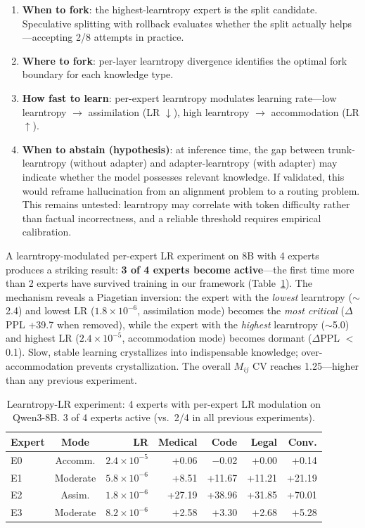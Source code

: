 \documentclass{article}
\begin{document}
\begin{enumerate}[nosep,leftmargin=1em]
\item \textbf{When to fork}: the highest-learntropy expert is the split
      candidate. Speculative splitting with rollback evaluates whether the
      split actually helps---accepting 2/8 attempts in practice.
\item \textbf{Where to fork}: per-layer learntropy divergence identifies the
      optimal fork boundary for each knowledge type.
\item \textbf{How fast to learn}: per-expert learntropy modulates learning
      rate---low learntropy $\to$ assimilation (LR $\downarrow$), high
      learntropy $\to$ accommodation (LR $\uparrow$).
\item \textbf{When to abstain (hypothesis)}: at inference time, the gap
      between trunk-learntropy (without adapter) and adapter-learntropy
      (with adapter) may indicate whether the model possesses relevant
      knowledge. If validated, this would reframe hallucination from an
      alignment problem to a routing problem. This remains untested:
      learntropy may correlate with token difficulty rather than factual
      incorrectness, and a reliable threshold requires empirical
      calibration.
\end{enumerate}

A learntropy-modulated per-expert LR experiment on 8B with 4 experts
produces a striking result: \textbf{3 of 4 experts become active}---the
first time more than 2 experts have survived training in our framework
(Table~\ref{tab:learntropy-lr}). The
mechanism reveals a Piagetian inversion: the expert with the \emph{lowest}
learntropy ($\sim$2.4) and lowest LR ($1.8 \times 10^{-6}$, assimilation
mode) becomes the \emph{most critical} ($\Delta$PPL +39.7 when removed),
while the expert with the \emph{highest} learntropy ($\sim$5.0) and highest
LR ($2.4 \times 10^{-5}$, accommodation mode) becomes dormant ($\Delta$PPL
$<$0.1). Slow, stable learning crystallizes into indispensable knowledge;
over-accommodation prevents crystallization. The overall $M_{ij}$ CV reaches
1.25---higher than any previous experiment.

\begin{table}[h]
\centering
\caption{Learntropy-LR experiment: 4 experts with per-expert LR modulation
on Qwen3-8B. 3 of 4 experts active (vs.\ 2/4 in all previous experiments).}
\label{tab:learntropy-lr}
\begin{tabular}{@{}lcrrrrr@{}}
\toprule
Expert & Mode & LR & Medical & Code & Legal & Conv. \\
\midrule
E0 & Accomm. & $2.4 \times 10^{-5}$ & +0.06 & $-$0.02 & +0.00 & +0.14 \\
E1 & Moderate & $5.8 \times 10^{-6}$ & +8.51 & +11.67 & +11.21 & +21.19 \\
E2 & Assim. & $1.8 \times 10^{-6}$ & +27.19 & +38.96 & +31.85 & +70.01 \\
E3 & Moderate & $8.2 \times 10^{-6}$ & +2.58 & +3.30 & +2.68 & +5.28 \\
\bottomrule
\end{tabular}
\end{table}
\end{document}
